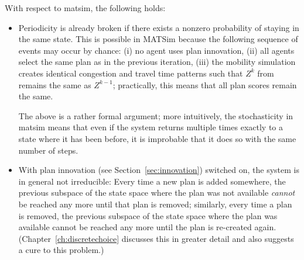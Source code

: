 With respect to \gls{matsim}, the following holds:
\begin{itemize}

\item Periodicity is already broken if there exists a nonzero probability of staying in
the same state. This is possible in MATSim 
because the following sequence of events may occur by chance:
(i) no agent uses plan innovation,
(ii) all agents select the same plan as in the previous iteration, 
(iii) the mobility simulation creates identical congestion and travel time patterns 
such that $Z^k$ from  remains the same as $Z^{k-1}$; practically, this means that all plan scores remain the same.   

The above is a rather formal argument; more intuitively, the stochasticity in \gls{matsim} means that even if the system returns multiple times exactly to a state where it has been before, it is improbable that it does so with the same number of steps. 



\item With plan innovation (see Section~\ref{sec:innovation}) switched on, the system is in general not irreducible:
Every time a new plan is added somewhere, the previous subspace of the state space where the plan was not available \emph{cannot} be reached any more until that plan is removed; similarly, every time a plan is removed, the previous subspace of the state space where the plan was available cannot be reached any more until the plan is re-created again. (Chapter~\ref{ch:discretechoice} discusses this in greater detail and also suggests a cure to this problem.)


\end{itemize}
